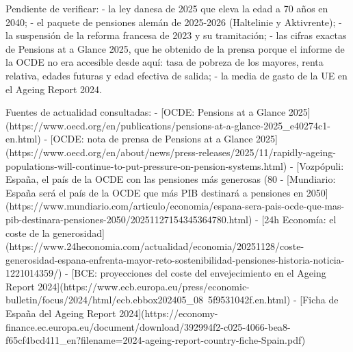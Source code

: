 \documentclass[10pt,a4paper]{article}
\begin{document}
Pendiente de verificar:
- la ley danesa de 2025 que eleva la edad a 70 años en 2040;
- el paquete de pensiones alemán de 2025-2026 (Haltelinie y Aktivrente);
- la suspensión de la reforma francesa de 2023 y su tramitación;
- las cifras exactas de Pensions at a Glance 2025, que he obtenido de la prensa porque el informe de la OCDE no era accesible desde aquí: tasa de pobreza de los mayores, renta relativa, edades futuras y edad efectiva de salida;
- la media de gasto de la UE en el Ageing Report 2024.

Fuentes de actualidad consultadas:
- [OCDE: Pensions at a Glance 2025](https://www.oecd.org/en/publications/pensions-at-a-glance-2025_e40274c1-en.html)
- [OCDE: nota de prensa de Pensions at a Glance 2025](https://www.oecd.org/en/about/news/press-releases/2025/11/rapidly-ageing-populations-will-continue-to-put-pressure-on-pension-systems.html)
- [Vozpópuli: España, el país de la OCDE con las pensiones más generosas (80%
- [Mundiario: España será el país de la OCDE que más PIB destinará a pensiones en 2050](https://www.mundiario.com/articulo/economia/espana-sera-pais-ocde-que-mas-pib-destinara-pensiones-2050/20251127154345364780.html)
- [24h Economía: el coste de la generosidad](https://www.24heconomia.com/actualidad/economia/20251128/coste-generosidad-espana-enfrenta-mayor-reto-sostenibilidad-pensiones-historia-noticia-1221014359/)
- [BCE: proyecciones del coste del envejecimiento en el Ageing Report 2024](https://www.ecb.europa.eu/press/economic-bulletin/focus/2024/html/ecb.ebbox202405_08~5f9531042f.en.html)
- [Ficha de España del Ageing Report 2024](https://economy-finance.ec.europa.eu/document/download/392994f2-c025-4066-bea8-f65cf4bcd411_en?filename=2024-ageing-report-country-fiche-Spain.pdf)





\clearpage
\end{document}
